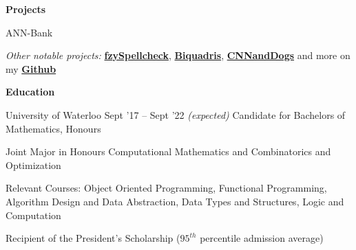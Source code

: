 \documentclass{resume} %
\begin{document}
\begin{rSection}{\textbf{Projects}}
\begin{rSubsection}{ANN-Bank}
    
  \end{rSubsection}

  \begin{rMinisection}
    \item {\em Other notable projects:}
      \href{https://github.com/MSJawad/Fuzzy-Spellcheck}{\textbf{fzySpellcheck}},
      \href{https://github.com/MiltonIp/Biquadris}{\textbf{Biquadris}},
      \href{https://github.com/MSJawad/CNNandDogs}{\textbf{CNNandDogs}} and more on my 
      \href{https://github.com/MSJawad}{\textbf{Github}}
  \end{rMinisection}
\end{rSection}


\begin{rSection}{\textbf{Education}}
  \begin{rSubsection}{University of Waterloo}
		     {Sept '17 -- Sept '22 \em (expected)}
		     {Candidate for Bachelors of Mathematics, Honours}
		     {}
	\item Joint Major in Honours Computational Mathematics and Combinatorics and Optimization
	\item Relevant Courses: Object Oriented Programming, Functional Programming, Algorithm Design and Data Abstraction, Data Types and Structures, Logic and Computation
    \item  Recipient of the President's Scholarship
      ($95^{th}$ percentile admission average)
  \end{rSubsection}
\end{rSection} 
\end{document}
